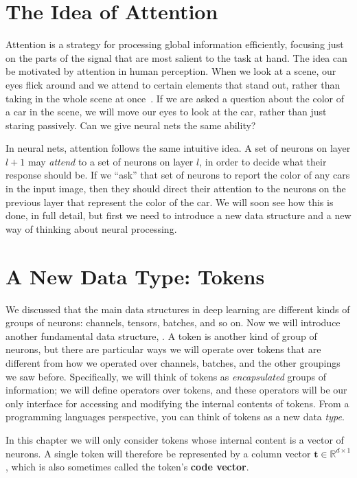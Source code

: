 
\section{The Idea of Attention}
Attention is a strategy for processing global information efficiently, focusing just on the parts of the signal that are most salient to the task at hand. The idea can be motivated by attention in human perception. When we look at a scene, our eyes flick around and we attend to certain elements that stand out, rather than taking in the whole scene at once~\cite{wolfe2000visual}. If we are asked a question about the color of a car in the scene, we will move our eyes to look at the car, rather than just staring passively. Can we give neural nets the same ability?

In neural nets, attention follows the same intuitive idea. A set of neurons on layer $l+1$ may \textit{attend} to a set of neurons on layer $l$, in order to decide what their response should be. If we ``ask'' that set of neurons to report the color of any cars in the input image, then they should direct their attention to the neurons on the previous layer that represent the color of the car. We will soon see how this is done, in full detail, but first we need to introduce a new data structure and a new way of thinking about neural processing.

\section{A New Data Type: Tokens}
We discussed that the main data structures in deep learning are different kinds of groups of neurons: channels, tensors, batches, and so on. Now we will introduce another fundamental data structure, . A token is another kind of group of neurons, but there are particular ways we will operate over tokens that are different from how we operated over channels, batches, and the other groupings we saw before. Specifically,  we will think of tokens as \textit{encapsulated} groups of information; we will define operators over tokens, and these operators will be our only interface for accessing and modifying the internal contents of tokens. From a programming languages perspective, you can think of tokens as a new data \textit{type}.

In this chapter we will only consider tokens whose internal content is a vector of neurons. A single token will therefore be represented by a column vector $\mathbf{t} \in \mathbb{R}^{d \times 1}$, which is also sometimes called the token's \textbf{code vector}.

